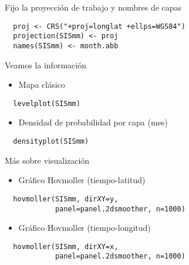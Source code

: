 \documentclass[xcolor={usenames,svgnames,dvipsnames}]{beamer}
\begin{document}
\begin{frame}[fragile,label=sec-2-3]{Fijo la proyección de trabajo y nombres de capas}
 \lstset{language=R,label= ,caption= ,numbers=none}
\begin{lstlisting}
  proj <- CRS("+proj=longlat +ellps=WGS84")
  projection(SISmm) <- proj
  names(SISmm) <- month.abb
\end{lstlisting}
\end{frame}

\begin{frame}[fragile,label=sec-2-4]{Veamos la información}
 \begin{itemize}
\item Mapa clásico
\end{itemize}
\lstset{language=R,label= ,caption= ,numbers=none}
\begin{lstlisting}
  levelplot(SISmm)
\end{lstlisting}
\begin{itemize}
\item Densidad de probabilidad por capa (mes)
\end{itemize}
\lstset{language=R,label= ,caption= ,numbers=none}
\begin{lstlisting}
  densityplot(SISmm)
\end{lstlisting}
\end{frame}
\begin{frame}[fragile,label=sec-2-5]{Más sobre visualización}
 \begin{itemize}
\item Gráfico Hovmoller (tiempo-latitud)
\end{itemize}
\lstset{language=R,label= ,caption= ,numbers=none}
\begin{lstlisting}
  hovmoller(SISmm, dirXY=y,
            panel=panel.2dsmoother, n=1000)
\end{lstlisting}
\begin{itemize}
\item Gráfico Hovmoller (tiempo-longitud)
\end{itemize}
\lstset{language=R,label= ,caption= ,numbers=none}
\begin{lstlisting}
  hovmoller(SISmm, dirXY=x,
            panel=panel.2dsmoother, n=1000)
\end{lstlisting}
\end{frame}
\end{document}
